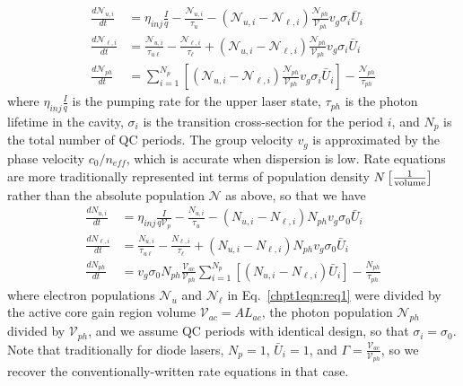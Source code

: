 {\begin{subequations}
\begin{align}
\frac{d \mathcal{N}_{u,i}}{dt} &= \eta_\textit{inj}\frac{I}{q} - \frac{\mathcal{N}_{u,i}}{\tau_u} - \left( \mathcal{N}_{u,i} - \mathcal{N}_{\ell,i}\right) \frac{\mathcal{N}_{ph}}{\mathcal{V}_{ph}} v_g \sigma_i \bar{U}_i\\
%
\frac{d \mathcal{N}_{\ell,i}}{dt} &= \frac{\mathcal{N}_{u,i}}{\tau_{u\ell}} - \frac{\mathcal{N}_{\ell,i}}{\tau_\ell} + \left( \mathcal{N}_{u,i} - \mathcal{N}_{\ell,i}\right) \frac{\mathcal{N}_{ph}}{\mathcal{V}_{ph}} v_g \sigma_i \bar{U}_i\\
%
\frac{d \mathcal{N}_{ph}}{dt} &= \sum_{i=1}^{N_p}\left[ \left( \mathcal{N}_{u,i} - \mathcal{N}_{\ell,i}\right) \frac{\mathcal{N}_{ph}}{\mathcal{V}_{ph}} v_g \sigma_i \bar{U}_i \right] - \frac{\mathcal{N}_{ph}}{\tau_{ph}}
\end{align}
\end{subequations}
where $\eta_\textit{inj}\frac{I}{q}$ is the pumping rate for the upper laser state, $\tau_{ph}$ is the photon lifetime in the cavity, $\sigma_i$ is the transition cross-section for the period $i$, and $N_p$ is the total number of QC periods.  The group velocity $v_g$ is approximated by the phase velocity $c_0/n_\textit{eff}$, which is accurate when dispersion is low.  Rate equations are more traditionally represented int terms of population density $N \left[\frac{1}{\textnormal{volume}}\right]$ rather than the absolute population $\mathcal{N}$ as above, so that we have
\begin{subequations}
\begin{align}
\frac{d N_{u,i}}{dt}&=\eta_\textit{inj} \frac{I}{q \mathcal{V}_{p}} - \frac{N_{u,i}}{\tau_u} - \left( N_{u,i} - N_{\ell,i}\right) N_{ph} v_g \sigma_0 \bar{U}_i\\
%
\frac{d N_{\ell,i}}{dt}&=\frac{N_{u,i}}{\tau_{u\ell}}-\frac{N_{\ell,i}}{\tau_\ell} + \left( N_{u,i} - N_{\ell,i}\right) N_{ph} v_g \sigma_0 \bar{U}_i\\
%
\frac{d N_{ph}}{dt}&=v_g \sigma_0 N_{ph} \frac{\mathcal{V}_{ac}}{\mathcal{V}_{ph}} \sum_{i=1}^{N_p}\left[ \left(N_{u,i} - N_{\ell,i}\right) \bar{U}_i \right] - \frac{N_{ph}}{\tau_{ph}}
\label{chpt1eqn:req2c}
\end{align}
\end{subequations}
where electron populations $\mathcal{N}_u$ and $\mathcal{N}_\ell$ in Eq.~\eqref{chpt1eqn:req1} were divided by the active core gain region volume $\mathcal{V}_{ac}=A L_{ac}$, the photon population $\mathcal{N}_{ph}$ divided by $\mathcal{V}_{ph}$, and we assume QC periods with identical design, so that $\sigma_i=\sigma_0$.  Note that traditionally for diode lasers, $N_p=1$, $\bar{U}_i=1$, and $\Gamma=\frac{\mathcal{V}_{ac}}{\mathcal{V}_{ph}}$, so we recover the conventionally-written rate equations \cite{Chuang} \cite{ColdrenCorzine} in that case.

}
